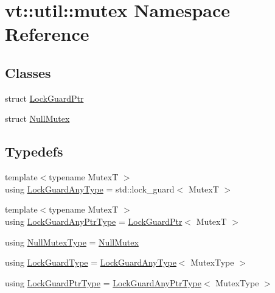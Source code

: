 \hypertarget{namespacevt_1_1util_1_1mutex}{}\section{vt\+:\+:util\+:\+:mutex Namespace Reference}
\label{namespacevt_1_1util_1_1mutex}
\subsection*{Classes}
\begin{DoxyCompactItemize}
\item 
struct \hyperlink{structvt_1_1util_1_1mutex_1_1_lock_guard_ptr}{Lock\+Guard\+Ptr}
\item 
struct \hyperlink{structvt_1_1util_1_1mutex_1_1_null_mutex}{Null\+Mutex}
\end{DoxyCompactItemize}
\subsection*{Typedefs}
\begin{DoxyCompactItemize}
\item 
{\footnotesize template$<$typename MutexT $>$ }\\using \hyperlink{namespacevt_1_1util_1_1mutex_ae88ee37c8846b0738a5137f96f912394}{Lock\+Guard\+Any\+Type} = std\+::lock\+\_\+guard$<$ MutexT $>$
\item 
{\footnotesize template$<$typename MutexT $>$ }\\using \hyperlink{namespacevt_1_1util_1_1mutex_ab8d2986992b726eed741bcae3bf9a789}{Lock\+Guard\+Any\+Ptr\+Type} = \hyperlink{structvt_1_1util_1_1mutex_1_1_lock_guard_ptr}{Lock\+Guard\+Ptr}$<$ MutexT $>$
\item 
using \hyperlink{namespacevt_1_1util_1_1mutex_a92b4648d6c680ec378e4f36ac5af414a}{Null\+Mutex\+Type} = \hyperlink{structvt_1_1util_1_1mutex_1_1_null_mutex}{Null\+Mutex}
\item 
using \hyperlink{namespacevt_1_1util_1_1mutex_a06a2c6944076fefe1b753e8eff4c58bd}{Lock\+Guard\+Type} = \hyperlink{namespacevt_1_1util_1_1mutex_ae88ee37c8846b0738a5137f96f912394}{Lock\+Guard\+Any\+Type}$<$ Mutex\+Type $>$
\item 
using \hyperlink{namespacevt_1_1util_1_1mutex_aca2c02dfb2d46edf4fc867f9ce64d0e5}{Lock\+Guard\+Ptr\+Type} = \hyperlink{namespacevt_1_1util_1_1mutex_ab8d2986992b726eed741bcae3bf9a789}{Lock\+Guard\+Any\+Ptr\+Type}$<$ Mutex\+Type $>$
\end{DoxyCompactItemize}


